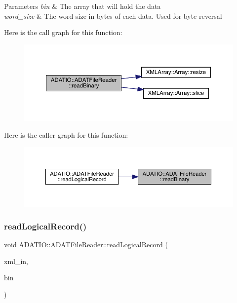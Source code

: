\begin{DoxyParams}{Parameters}
{\em bin} & The array that will hold the data \\
\hline
{\em word\+\_\+size} & The word size in bytes of each data. Used for byte reversal \\
\hline
\end{DoxyParams}
Here is the call graph for this function\+:\nopagebreak
\begin{figure}[H]
\begin{center}
\leavevmode
\includegraphics[width=350pt]{db/de5/group__qio_ga40b41bda2b27ce68a0ac0ee28124fc64_cgraph}
\end{center}
\end{figure}
Here is the caller graph for this function\+:\nopagebreak
\begin{figure}[H]
\begin{center}
\leavevmode
\includegraphics[width=350pt]{db/de5/group__qio_ga40b41bda2b27ce68a0ac0ee28124fc64_icgraph}
\end{center}
\end{figure}
\mbox{\label{group__qio_ga7d36d6dd7fef90986d0c435ddaa86eae}} 
\subsubsection{\texorpdfstring{readLogicalRecord()}{readLogicalRecord()}}
{\footnotesize\ttfamily void A\+D\+A\+T\+I\+O\+::\+A\+D\+A\+T\+File\+Reader\+::read\+Logical\+Record (\begin{DoxyParamCaption}\item[{\mbox{\hyperlink{classADATXML_1_1XMLReader}{X\+M\+L\+Reader}} \&}]{xml\+\_\+in,  }\item[{\mbox{\hyperlink{classXMLArray_1_1Array}{Array}}$<$ char $>$ \&}]{bin }\end{DoxyParamCaption})\hspace{0.3cm}{\ttfamily [protected]}}



